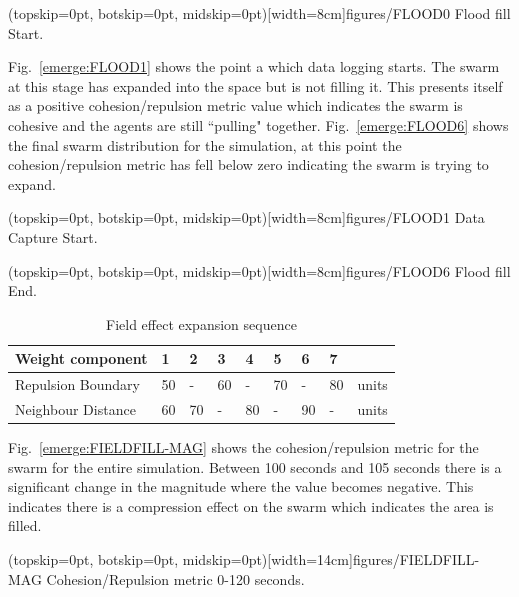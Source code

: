 \documentclass{ieeeaccess}
\begin{document}
\Figure[t!](topskip=0pt, botskip=0pt, midskip=0pt)[width=8cm]{figures/FLOOD0}
{Flood fill Start.\label{emerge:FLOOD0}}

Fig.~\ref{emerge:FLOOD1} shows the point a which data logging starts. The swarm at this stage has expanded into the space but is not filling it. This presents itself as a positive cohesion/repulsion metric value which indicates the swarm is cohesive and the agents are still ``pulling" together. Fig.~\ref{emerge:FLOOD6} shows the final swarm distribution for the simulation, at this point the cohesion/repulsion metric has fell below zero indicating the swarm is trying to expand. 

\Figure[t!](topskip=0pt, botskip=0pt, midskip=0pt)[width=8cm]{figures/FLOOD1}
{Data Capture Start.\label{emerge:FLOOD1}}

\Figure[t!](topskip=0pt, botskip=0pt, midskip=0pt)[width=8cm]{figures/FLOOD6}
{Flood fill End.\label{emerge:FLOOD6}}

\begin{table}[H]
\begin{center}
\begin{tabular}{| p{1.8cm} | p{0.3cm} | p{0.3cm} | p{0.3cm} | p{0.3cm} | p{0.3cm} | p{0.3cm} | p{0.3cm} | p{0.7cm} |}
\hline
\bf Weight \bf component & \bf 1 & \bf 2 & \bf 3 & \bf 4 & \bf 5 & \bf 6 & \bf 7 & \\ \hline
Repulsion Boundary & 50 & -  & 60 & -  & 70 & -  & 80 & units\\  \hline
Neighbour Distance & 60 & 70 & -  & 80 & -  & 90 & -  & units\\  \hline
\end{tabular}\caption{Field effect expansion sequence} \label{tab:FillSequence}
\end{center}
\end{table}

Fig.~\ref{emerge:FIELDFILL-MAG} shows the cohesion/repulsion metric for the swarm for the entire simulation. Between 100 seconds and 105 seconds there is a significant change in the magnitude where the value becomes negative. This indicates there is a compression effect on the swarm which indicates the area is filled.

\Figure[t!](topskip=0pt, botskip=0pt, midskip=0pt)[width=14cm]{figures/FIELDFILL-MAG}
{Cohesion/Repulsion metric 0-120 seconds.\label{emerge:FIELDFILL-MAG}}

\end{document}
